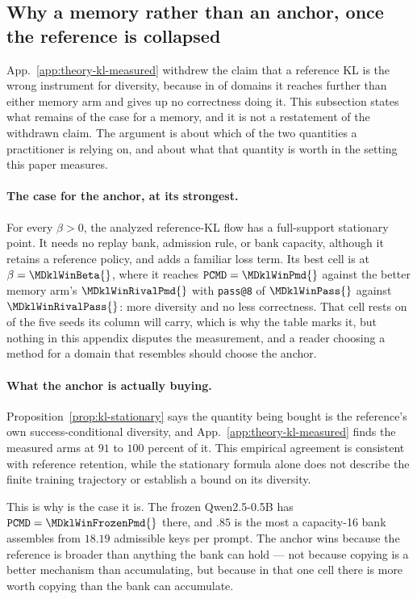 \documentclass{article}
\newcommand{\1}{\mathbf 1}
\newcommand{\pmd}{\texttt{PCMD}}
\theoremstyle{remark}
\theoremstyle{definition}
\theoremstyle{plain}
\begin{document}
\subsection{Why a memory rather than an anchor, once the reference is collapsed}
\label{app:theory-kl-case}

App.~\ref{app:theory-kl-measured} withdrew the claim that a reference KL is the
wrong instrument for diversity, because in \MDklFreeDomains{} of \MDklDomains{}
domains it reaches further than either memory arm and gives up no correctness
doing it. This subsection states what remains of the
case for a memory, and it is not a restatement of the withdrawn claim. The
argument is about which of the two quantities a practitioner is relying on, and
about what that quantity is worth in the setting this paper measures.

\paragraph{The case for the anchor, at its strongest.}
For every $\beta>0$, the analyzed reference-KL flow has a full-support
stationary point. It needs no replay bank, admission rule, or bank capacity,
although it retains a reference policy, and adds a familiar loss term. Its best cell is \MDklWinDomain{} at $\beta=\MDklWinBeta{}$,
where it reaches $\pmd{}=\MDklWinPmd{}$ against the better memory arm's
$\MDklWinRivalPmd{}$ with \texttt{pass@8} of $\MDklWinPass{}$ against
$\MDklWinRivalPass{}$: more diversity and no less correctness. That cell rests on
\MDklWinSeeds{} of the five seeds its column will carry, which is why the table
marks it, but nothing in this appendix disputes the measurement, and a reader
choosing a method for a domain that resembles \MDklWinDomain{} should choose
the anchor.

\paragraph{What the anchor is actually buying.}
Proposition~\ref{prop:kl-stationary} says the quantity being bought is the
reference's own success-conditional diversity, and
App.~\ref{app:theory-kl-measured} finds the measured arms at $91$ to $100$
percent of it. This empirical agreement is consistent with reference
retention, while the stationary formula alone does not describe the finite
training trajectory or establish a bound on its diversity.

This is why \MDklWinDomain{} is the case it is. The frozen Qwen2.5-0.5B has
$\pmd{}=\MDklWinFrozenPmd{}$ there, and $.85$ is the most a capacity-16 bank assembles from
$18.19$ admissible keys per prompt. The anchor wins because the reference is
broader than anything the bank can hold --- not because copying is a better
mechanism than accumulating, but because in that one cell there is more worth
copying than the bank can accumulate.
\end{document}
